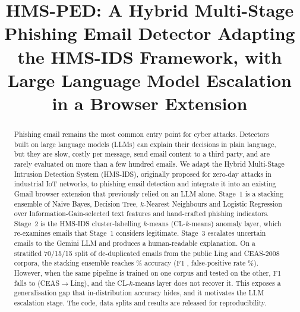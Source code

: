 \documentclass[conference]{IEEEtran}
\begin{document}
\title{HMS-PED: A Hybrid Multi-Stage Phishing Email Detector Adapting the HMS-IDS Framework, with Large Language Model Escalation in a Browser Extension}

\author{
\and
{}
}

\maketitle

\begin{abstract}
Phishing email remains the most common entry point for cyber attacks. Detectors built on large language models (LLMs) can explain their decisions in plain language, but they are slow, costly per message, send email content to a third party, and are rarely evaluated on more than a few hundred emails. We adapt the Hybrid Multi-Stage Intrusion Detection System (HMS-IDS), originally proposed for zero-day attacks in industrial IoT networks, to phishing email detection and integrate it into an existing Gmail browser extension that previously relied on an LLM alone. Stage~1 is a stacking ensemble of Naive Bayes, Decision Tree, $k$-Nearest Neighbours and Logistic Regression over Information-Gain-selected text features and hand-crafted phishing indicators. Stage~2 is the HMS-IDS cluster-labelling $k$-means (CL-$k$-means) anomaly layer, which re-examines emails that Stage~1 considers legitimate. Stage~3 escalates uncertain emails to the Gemini LLM and produces a human-readable explanation. On a stratified 70/15/15 split of \NTotal{} de-duplicated emails from the public Ling and CEAS-2008 corpora, the stacking ensemble reaches \StackAcc\% accuracy (F1 \StackFone, false-positive rate \StackFPR\%). However, when the same pipeline is trained on one corpus and tested on the other, F1 falls to \XCLStackFone{} (CEAS$\rightarrow$Ling), and the CL-$k$-means layer does not recover it. This exposes a generalisation gap that in-distribution accuracy hides, and it motivates the LLM escalation stage. The code, data splits and results are released for reproducibility.
\end{abstract}
\end{document}
